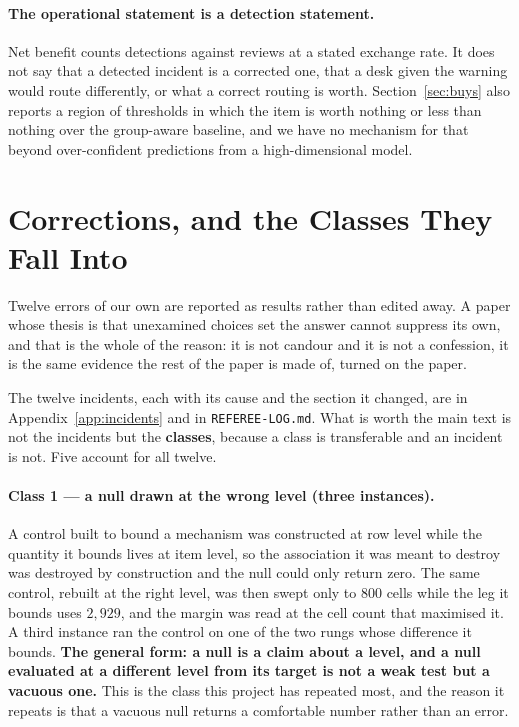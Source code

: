 \documentclass[preprint,12pt]{elsarticle}
\begin{document}
\paragraph{The operational statement is a detection statement.}
Net benefit counts detections against reviews at a stated exchange rate. It
does not say that a detected incident is a corrected one, that a desk given
the warning would route differently, or what a correct routing is worth.
Section~\ref{sec:buys} also reports a region of thresholds in which the item
is worth nothing or less than nothing over the group-aware baseline, and we
have no mechanism for that beyond over-confident predictions from a
high-dimensional model.

\section{Corrections, and the Classes They Fall Into}
\label{sec:corrections}

Twelve errors of our own are reported as results rather than edited away. A
paper whose thesis is that unexamined choices set the answer cannot suppress
its own, and that is the whole of the reason: it is not candour and it is not
a confession, it is the same evidence the rest of the paper is made of, turned
on the paper.

The twelve incidents, each with its cause and the section it changed, are in
Appendix~\ref{app:incidents} and in \texttt{REFEREE-LOG.md}. What is worth the
main text is not the incidents but the \textbf{classes}, because a class is
transferable and an incident is not. Five account for all twelve.

\paragraph{Class 1 --- a null drawn at the wrong level (three instances).} A
control built to bound a mechanism was constructed at row level while the
quantity it bounds lives at item level, so the association it was meant to
destroy was destroyed by construction and the null could only return zero. The
same control, rebuilt at the right level, was then swept only to $800$ cells
while the leg it bounds uses $2{,}929$, and the margin was read at the cell
count that maximised it. A third instance ran the control on one of the two
rungs whose difference it bounds. \textbf{The general form: a null is a claim
about a level, and a null evaluated at a different level from its target is not
a weak test but a vacuous one.} This is the class this project has repeated
most, and the reason it repeats is that a vacuous null returns a comfortable
number rather than an error.
\end{document}
